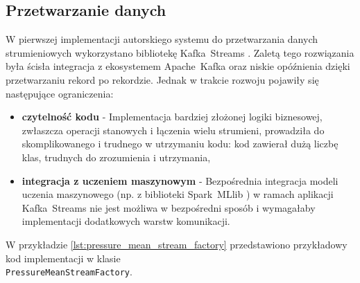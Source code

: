 \subsection{Przetwarzanie danych}

W pierwszej implementacji autorskiego systemu do przetwarzania danych strumieniowych wykorzystano bibliotekę \mbox{Kafka Streams} \cite{kafka_streams}. Zaletą tego rozwiązania była ścisła integracja z ekosystemem \mbox{Apache Kafka} \cite{kafka} oraz niskie opóźnienia dzięki przetwarzaniu rekord po rekordzie. Jednak w trakcie rozwoju pojawiły się następujące ograniczenia:
\begin{itemize}
    \item \textbf{czytelność kodu} - Implementacja bardziej złożonej logiki biznesowej, zwłaszcza operacji stanowych i łączenia wielu strumieni, prowadziła do skomplikowanego i trudnego w utrzymaniu kodu: kod zawierał dużą liczbę klas, trudnych do zrozumienia i utrzymania,
    \item \textbf{integracja z uczeniem maszynowym} - Bezpośrednia integracja modeli uczenia maszynowego (np. z biblioteki \mbox{Spark MLlib} \cite{spark_mllib_reference}) w ramach aplikacji \mbox{Kafka Streams} nie jest możliwa w bezpośredni sposób i wymagałaby implementacji dodatkowych warstw komunikacji.
\end{itemize}

W przykładzie \ref{lst:pressure_mean_stream_factory} przedstawiono przykładowy kod implementacji w klasie \\ \mbox{\texttt{PressureMeanStreamFactory}}.

\newpage


